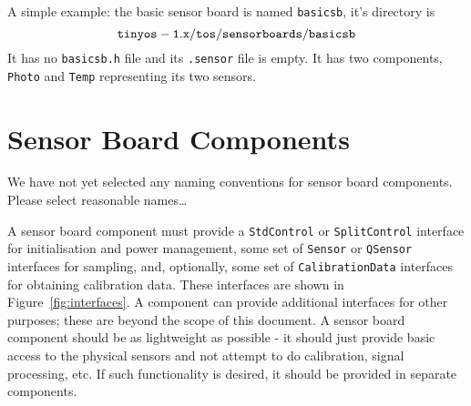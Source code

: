 \documentclass{article}
\newcommand{\fname}[1]{{\tt #1}}
\newcommand{\code}[1]{{\tt #1}}
\begin{document}
A simple example: the basic sensor board is named {\tt basicsb}, it's
directory is \[ \fname{tinyos-1.x/tos/sensorboards/basicsb} \] It has no
\fname{basicsb.h} file and its \fname{.sensor} file is empty. It has two
components, {\tt Photo} and {\tt Temp} representing its two sensors.



\section{Sensor Board Components}
\label{sec:sensor-components}

We have not yet selected any naming conventions for sensor board
components. Please select reasonable names\ldots

A sensor board component must provide a \code{StdControl} or
\code{SplitControl} interface for initialisation and power management, some
set of \code{Sensor} or \code{QSensor} interfaces for sampling, and,
optionally, some set of \code{CalibrationData} interfaces for obtaining
calibration data. These interfaces are shown in
Figure~\ref{fig:interfaces}. A component can provide additional interfaces
for other purposes; these are beyond the scope of this document. A sensor
board component should be as lightweight as possible - it should just
provide basic access to the physical sensors and not attempt to do
calibration, signal processing, etc. If such functionality is desired, it
should be provided in separate components.
\end{document}
